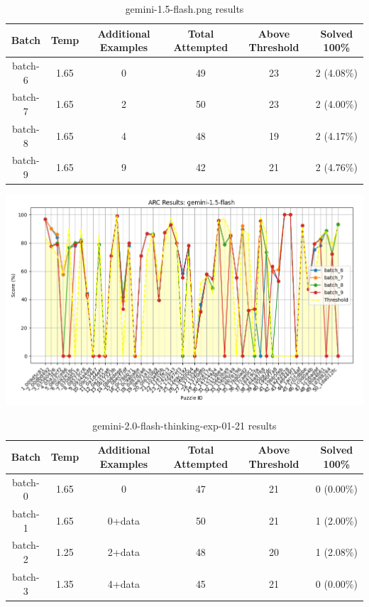 \documentclass[11pt]{scrartcl}
\begin{document}
\begin{table}[h]
    \centering
    \begin{tabular}{|c|c|c|c|c|c|}
        \hline
        Batch & Temp & Additional Examples & Total Attempted & Above Threshold & Solved 100\% \\ 
        \hline
        batch-6 & 1.65 & 0 & 49 & 23 & 2 (4.08\%)   \\ 
        batch-7 & 1.65 & 2 & 50 & 23 & 2 (4.00\%)   \\ 
        batch-8 & 1.65 & 4 & 48 & 19 & 2 (4.17\%)   \\ 
        batch-9 & 1.65 & 9 & 42 & 21 & 2 (4.76\%)   \\ 
        \hline
    \end{tabular}
    \caption{ gemini-1.5-flash.png results }
    \label{tab:example}
\end{table}

\includegraphics[width=0.99\linewidth, center]{gemini-1.5-flash.png}

\begin{table}[h]
    \centering
    \begin{tabular}{|c|c|c|c|c|c|}
        \hline
        Batch & Temp & Additional Examples & Total Attempted & Above Threshold & Solved 100\% \\ 
        \hline
        batch-0 & 1.65 & 0 & 47 & 21 & 0 (0.00\%)   \\ 
        batch-1 & 1.65 & 0+data & 50 & 21 & 1 (2.00\%)   \\ 
        batch-2 & 1.25 & 2+data & 48 & 20 & 1 (2.08\%)   \\ 
        batch-3 & 1.35 & 4+data & 45 & 21 & 0 (0.00\%)   \\ 
        \hline
    \end{tabular}
    \caption{ gemini-2.0-flash-thinking-exp-01-21 results }
    \label{tab:example}
\end{table}
\end{document}
